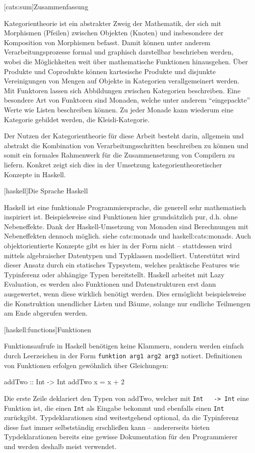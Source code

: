 \documentclass[12pt, a4paper, bibgerm]{scrbook}
\newenvironment{DIFnomarkup}{}{}
\newcommand\icode[1]{\lstinline?#1?}
\newcommand\lchapter{}
\newcommand\lsection{}
\newcommand\sref{}
\begin{document}
\lsection[cats:sum]{Zusammenfassung}

Kategorientheorie ist ein abstrakter Zweig der Mathematik, der sich mit
Morphismen (Pfeilen) zwischen Objekten (Knoten) und insbesondere der
Komposition von Morphismen befasst. Damit können unter anderem
Verarbeitungsprozesse formal und graphisch darstellbar beschrieben
werden, wobei die Möglichkeiten weit über mathematische Funktionen
hinausgehen. Über Produkte und Coprodukte können kartesische Produkte
und disjunkte Vereinigungen von Mengen auf Objekte in Kategorien
verallgemeinert werden. Mit Funktoren lassen sich Abbildungen zwischen
Kategorien beschreiben. Eine besondere Art von Funktoren sind Monaden,
welche unter anderem ``eingepackte'' Werte wie Listen beschreiben
können. Zu jeder Monade kann wiederum eine Kategorie gebildet werden,
die Kleisli-Kategorie.

Der Nutzen der Kategorientheorie für diese Arbeit besteht darin,
allgemein und abstrakt die Kombination von Verarbeitungsschritten
beschreiben zu können und somit ein formales Rahmenwerk für die
Zusammensetzung von Compilern zu liefern. Konkret zeigt sich dies in der
Umsetzung kategorientheoretischer Konzepte in Haskell.

\lchapter[haskell]{Die Sprache Haskell}

Haskell ist eine funktionale Programmiersprache, die generell sehr
mathematisch inspiriert ist. Beispielsweise sind Funktionen hier
grundsätzlich pur, d.h. ohne Nebeneffekte. Dank der Haskell-Umsetzung
von Monaden sind Berechnungen mit Nebeneffekten dennoch möglich. siehe
\sref{cats:monads} und \sref{haskell:cats:monads}. Auch
objektorientierte Konzepte gibt es hier in der Form nicht -- stattdessen
wird mittels algebraischer Datentypen und Typklassen
modelliert. Unterstützt wird dieser Ansatz durch ein statisches
Typsystem, welches praktische Features wie Typinferenz oder abhängige
Typen bereitstellt. Haskell arbeitet mit Lazy Evaluation, es werden also
Funktionen und Datenstrukturen erst dann ausgewertet, wenn diese
wirklich benötigt werden. Dies ermöglicht beispielsweise die
Konstruktion unendlicher Listen und Bäume, solange nur endliche
Teilmengen am Ende abgerufen werden.

\lsection[haskell:functions]{Funktionen}

Funktionsaufrufe in Haskell benötigen keine Klammern, sondern werden
einfach durch Leerzeichen in der Form \icode{funktion arg1 arg2 arg3}
notiert. Definitionen von Funktionen erfolgen gewöhnlich über
Gleichungen:
\begin{DIFnomarkup}\begin{code}
addTwo :: Int -> Int
addTwo x = x + 2  
\end{code}\end{DIFnomarkup}
Die erste Zeile deklariert den Typen von addTwo, welcher mit \icode{Int
  -> Int} eine Funktion ist, die einen \icode{Int} als Eingabe bekommt
und ebenfalls einen \icode{Int} zurückgibt. Typdeklarationen sind
weitestgehend optional, da die Typinferenz diese fast immer
selbstständig erschließen kann -- andererseits bieten Typdeklarationen
bereits eine gewisse Dokumentation für den Programmierer und werden
deshalb meist verwendet.
\end{document}
